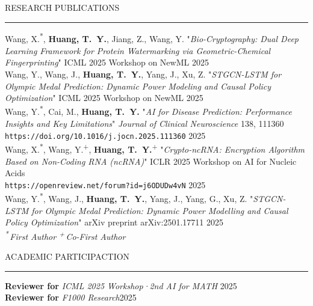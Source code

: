\documentclass{resume} %
\renewenvironment{rSection}[1]{
\sectionskip
\textcolor{TsinghuaPurple}{\MakeUppercase{#1}}
\sectionlineskip
\hrule
\begin{list}{}{
\setlength{\leftmargin}{0em}
}
\item[]
}{
\end{list}
}
\begin{document}
\begin{rSection}{Research Publications}\itemsep -3pt         

{Wang, X.\textsuperscript{*}, \textbf{Huang, T.~Y.}, Jiang, Z., Wang, Y.  
"\textit{Bio\mbox{-}Cryptography: Dual Deep Learning Framework for Protein Watermarking via Geometric\mbox{-}Chemical Fingerprinting}"  
ICML 2025 Workshop on NewML} \hfill 2025 \\
{Wang, Y., Wang, J., \textbf{Huang, T.~Y.}, Yang, J., Xu, Z.  
"\textit{STGCN\mbox{-}LSTM for Olympic Medal Prediction: Dynamic Power Modeling and Causal Policy Optimization}"  
ICML 2025 Workshop on NewML} \hfill 2025 \\
{Wang, Y.\textsuperscript{*}, Cai, M., \textbf{Huang, T.~Y.}  
"\textit{AI for Disease Prediction: Performance Insights and Key Limitations}"  
\textit{Journal of Clinical Neuroscience} 138, 111360}\\
\texttt{https://doi.org/10.1016/j.jocn.2025.111360} \hfill 2025 \\
{Wang, X.\textsuperscript{*}, Wang, Y.\textsuperscript{+}, \textbf{Huang, T.~Y.}\textsuperscript{+}  
"\textit{Crypto\mbox{-}ncRNA: Encryption Algorithm Based on Non\mbox{-}Coding RNA (ncRNA)}"  
ICLR 2025 Workshop on AI for Nucleic Acids}\\
\texttt{https://openreview.net/forum?id=j6ODUDw4vN} \hfill 2025 \\
{Wang, Y.\textsuperscript{*}, Wang, J., \textbf{Huang, T.~Y.}, Yang, J., Yang, G., Xu, Z.  
"\textit{STGCN\mbox{-}LSTM for Olympic Medal Prediction: Dynamic Power Modelling and Causal Policy Optimization}"  
arXiv preprint arXiv:2501.17711} \hfill 2025 \\
\textit{\footnotesize \textsuperscript{*}\,First Author \quad \textsuperscript{+}\,Co-First Author}
\end{rSection}

\begin{rSection}{ACADEMIC PARTICIPACTION}\itemsep -3pt

{\bf Reviewer for} \textit{ICML 2025 Workshop·2nd AI for MATH} \hfill 2025\\
{\bf Reviewer for} \textit{F1000 Research}\hfill 2025
\end{rSection}
\end{document}
